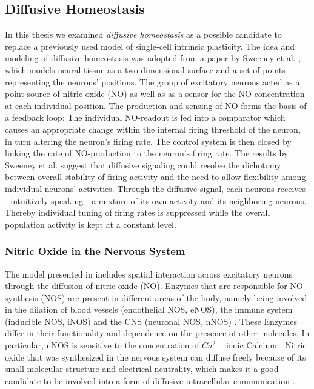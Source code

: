\documentclass[10pt,a4paper]{article}
\begin{document}
\subsection{Diffusive Homeostasis}\label{DIff_Hom_Intro_Section}
In this thesis we examined \textit{diffusive homeostasis} as a possible candidate to replace a previously used model of single-cell intrinsic plasticity. The idea and modeling of diffusive homeostasis was adopted from a paper by Sweeney et al. \cite{Sweeney_Paper}, which models neural tissue as a two-dimensional surface and a set of points representing the neurons' positions. The group of excitatory neurons acted as a point-source of nitric oxide (NO) as well as as a sensor for the NO-concentration at each individual position. The production and sensing of NO forms the basis of a feedback loop: The individual NO-readout is fed into a comparator which causes an appropriate change within the internal firing threshold of the neuron, in turn altering the neuron's firing rate. The control system is then closed by linking the rate of NO-production to the neuron's firing rate. The results by Sweeney et al. suggest that diffusive signaling could resolve the dichotomy between overall stability of firing activity and the need to allow flexibility among individual neurons' activities. Through the diffusive signal, each neurons receives - intuitively speaking - a mixture of its own activity and its neighboring neurons. Thereby individual tuning of firing rates is suppressed while the overall population activity is kept at a constant level.

\subsubsection{Nitric Oxide in the Nervous System}\label{NO_Experiments_Section}
The model presented in \cite{Sweeney_Paper} includes spatial interaction across excitatory neurons through the diffusion of nitric oxide (NO). Enzymes that are responsible for NO synthesis (NOS) are present in different areas of the body, namely being involved in the dilation of blood vessels (endothelial NOS, eNOS), the immune system (inducible NOS, iNOS) and the CNS (neuronal NOS, nNOS) \cite{NOS_Mammals}. These Enzymes differ in their functionality and dependence on the presence of other molecules. In particular, nNOS is sensitive to the concentration of $Ca^{2+}$ ionic Calcium \cite{Knowles_Ca_nNOS,Steinert_NO}. Nitric oxide that was synthesized in the nervous system can diffuse freely because of its small molecular structure and electrical neutrality, which makes it a good candidate to be involved into a form of diffusive intracellular communication \cite{Lancaster_1994}. 
\end{document}
